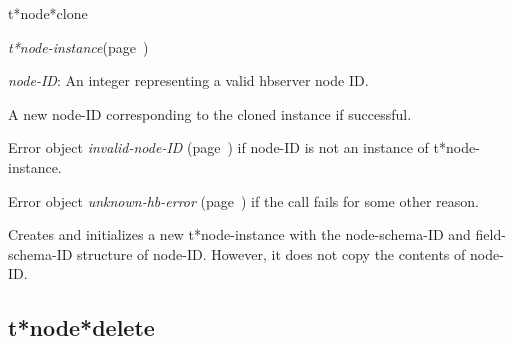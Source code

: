 \begin{description}
\item [Name:]  t*node*clone

\item [Class:] {\sl t*node-instance}\hfill(page~\pageref{t*node-instance})

\item [Parameters:]
\item {\sl node-ID}:   An integer representing
a valid hbserver node ID.


\item [Return-value:]
A new node-ID corresponding to the cloned instance 
if successful.

Error object {\sl invalid-node-ID} (page~\pageref{invalid-node-ID}) if node-ID is not
an instance of t*node-instance.

Error object {\sl unknown-hb-error} (page~\pageref{unknown-hb-error}) if the call fails
for some other reason. 

\item [Description:]

Creates and initializes a new t*node-instance with 
the node-schema-ID and field-schema-ID structure of 
node-ID. However, it does not copy the contents of 
node-ID.

\item [Public:]



\end{description}
\horizontalline

\subsection{t*node*delete}
\label{t*node*delete}


